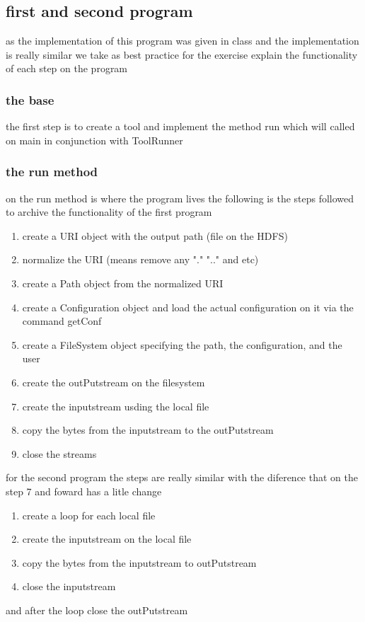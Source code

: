 \documentclass[a4paper]{article}
\begin{document}
\subsection{first and second program}
\label{sec:orgheadline11}
as the implementation of this program was given in class and the implementation is really similar
we take as best practice for the exercise explain the functionality of each step on the program
\subsubsection{the base}
\label{sec:orgheadline9}
the first step is to create a tool and implement the method run which will called on main in conjunction with ToolRunner
\subsubsection{the run method}
\label{sec:orgheadline10}
on the run method is where the program lives
the following is the steps followed to archive the functionality of the first program
\begin{enumerate}
\item create a URI object with the output path (file on the HDFS)
\item normalize the URI (means remove any "." ".." and etc)
\item create a Path object from the normalized URI
\item create a Configuration object and load the actual configuration on it via the command getConf
\item create a FileSystem object specifying the path, the configuration, and the user
\item create the outPutstream on the filesystem
\item create the inputstream usding the local file
\item copy the bytes from the inputstream to the outPutstream
\item close the streams
\end{enumerate}

for the second program the steps are really similar with the diference that on the step 7 and foward
has a litle change
\begin{enumerate}
\item create a loop for each local file
\item create the inputstream on the local file
\item copy the bytes from the inputstream to outPutstream
\item close the inputstream
\end{enumerate}
and after the loop close the outPutstream
\end{document}
